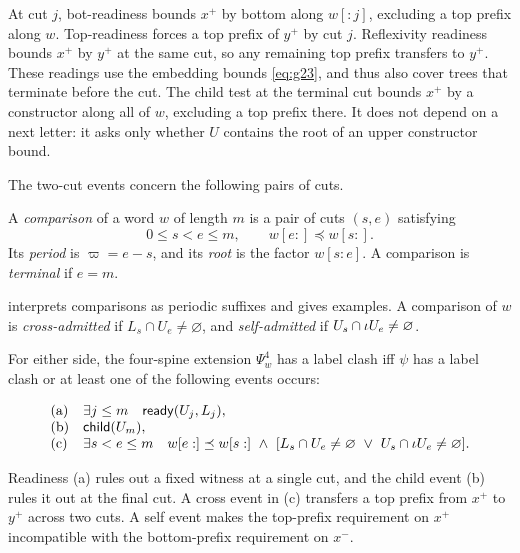At cut $j$, bot-readiness bounds $x^+$ by bottom along $w[:j]$,
excluding a top prefix along $w$. Top-readiness forces a top prefix of
$y^+$ by cut $j$. Reflexivity readiness bounds $x^+$ by $y^+$ at the
same cut, so any remaining top prefix transfers to $y^+$.
These readings use the embedding bounds \eqref{eq:g23}, and thus also
cover trees that terminate before the cut. The child test at the terminal
cut bounds $x^+$ by a constructor along all of $w$, excluding a top
prefix there. It does not depend on a next letter: it asks only whether
$U$ contains the root of an upper constructor bound.

The two-cut events concern the following pairs of cuts.

\begin{definition}[Comparison]\label{def:comparison}
A \emph{comparison} of a word $w$ of length $m$ is a pair of cuts $(s,e)$
satisfying
\begin{equation}\label{eq:g35}
0\le s<e\le m,\qquad w[e:]\preceq w[s:].
\end{equation}
Its \emph{period} is $\varpi=e-s$, and its \emph{root} is the factor
$w[s:e]$. A comparison is \emph{terminal} if $e=m$.
\end{definition}

 interprets comparisons as periodic suffixes and gives
examples. A comparison of $w$ is \emph{cross-admitted} if
$L_s\cap U_e\ne\varnothing$, and \emph{self-admitted}
if $U_s\cap\iota U_e\ne\varnothing$.

\begin{theorem}\label{thm:clashes}
For either side, the four-spine extension $\Psi^4_w$ has a label
clash iff $\psi$ has a label clash or at least one of the
following events occurs:

\begin{equation}\label{eq:g36}
\begin{array}{ll}
 \text{(a)}&\exists j\le m\quad\mathsf{ready}(U_j,L_j),\\
 \text{(b)}&\mathsf{child}(U_m),\\
 \text{(c)}&\exists s<e\le m\quad w[e:]\preceq w[s:]\ \land\
 [L_s\cap U_e\ne\varnothing\ \lor\ U_s\cap\iota U_e\ne\varnothing].
 \end{array}
\end{equation}

\end{theorem}

Readiness (a) rules out a fixed witness at a single cut, and the child event
(b) rules it out at the final cut. A cross event in (c) transfers a top
prefix from $x^+$ to $y^+$ across two cuts. A self event makes
the top-prefix requirement on $x^+$ incompatible with the bottom-prefix
requirement on $x^-$.

